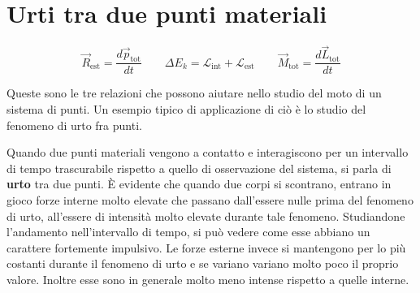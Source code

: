 \section{Urti tra due punti materiali}

\[
	\vec{R}_\text{est}=\frac{d\vec{p}_\text{tot}}{dt} \qquad \Delta E_k=\mathcal{L}_\text{int}+\mathcal{L}_\text{est} \qquad \vec{M}_\text{tot}=\frac{d\vec{L}_\text{tot}}{dt}
\]

Queste sono le tre relazioni che possono aiutare nello studio del moto di un sistema di punti. Un esempio tipico di applicazione di ciò è lo studio del fenomeno di urto fra punti.

Quando due punti materiali vengono a contatto e interagiscono per un intervallo di tempo trascurabile rispetto a quello di osservazione del sistema, si parla di \textbf{urto} tra due punti. È evidente che quando due corpi si scontrano, entrano in gioco forze interne molto elevate che passano dall'essere nulle prima del fenomeno di urto, all'essere di intensità molto elevate durante tale fenomeno. Studiandone l'andamento nell'intervallo di tempo, si può vedere come esse abbiano un carattere fortemente impulsivo. Le forze esterne invece si mantengono per lo più costanti durante il fenomeno di urto e se variano variano molto poco il proprio valore. Inoltre esse sono in generale molto meno intense rispetto a quelle interne.

